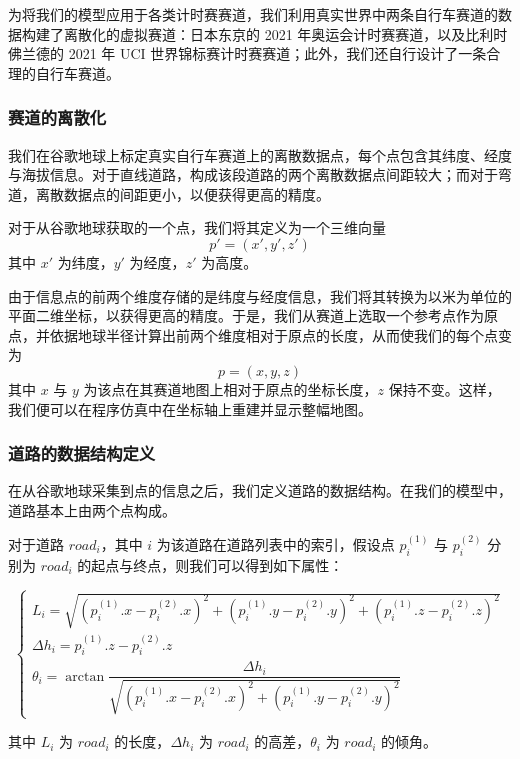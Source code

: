 \documentclass[11pt,a4paper]{ctexart}
\begin{document}
为将我们的模型应用于各类计时赛赛道，我们利用真实世界中两条自行车赛道的数据构建了离散化的虚拟赛道：日本东京的 2021 年奥运会计时赛赛道，以及比利时佛兰德的 2021 年 UCI 世界锦标赛计时赛赛道；此外，我们还自行设计了一条合理的自行车赛道。

\subsubsection{赛道的离散化}

我们在谷歌地球上标定真实自行车赛道上的离散数据点，每个点包含其纬度、经度与海拔信息。对于直线道路，构成该段道路的两个离散数据点间距较大；而对于弯道，离散数据点的间距更小，以便获得更高的精度。

对于从谷歌地球获取的一个点，我们将其定义为一个三维向量
\[
p'=(x',y',z')
\]
其中 $x'$ 为纬度，$y'$ 为经度，$z'$ 为高度。

由于信息点的前两个维度存储的是纬度与经度信息，我们将其转换为以米为单位的平面二维坐标，以获得更高的精度。于是，我们从赛道上选取一个参考点作为原点，并依据地球半径计算出前两个维度相对于原点的长度，从而使我们的每个点变为
\[
p=(x,y,z)
\]
其中 $x$ 与 $y$ 为该点在其赛道地图上相对于原点的坐标长度，$z$ 保持不变。这样，我们便可以在程序仿真中在坐标轴上重建并显示整幅地图。

\subsubsection{道路的数据结构定义}

在从谷歌地球采集到点的信息之后，我们定义道路的数据结构。在我们的模型中，道路基本上由两个点构成。

对于道路 $road_i$，其中 $i$ 为该道路在道路列表中的索引，假设点 $p_i^{(1)}$ 与 $p_i^{(2)}$ 分别为 $road_i$ 的起点与终点，则我们可以得到如下属性：

\begin{equation}
\begin{cases}
L_i=\sqrt{\left(p_i^{(1)}.x-p_i^{(2)}.x\right)^2+\left(p_i^{(1)}.y-p_i^{(2)}.y\right)^2+\left(p_i^{(1)}.z-p_i^{(2)}.z\right)^2}\\[0.6em]
\Delta h_i=p_i^{(1)}.z-p_i^{(2)}.z\\[0.4em]
\theta_i=\arctan\dfrac{\Delta h_i}{\sqrt{\left(p_i^{(1)}.x-p_i^{(2)}.x\right)^2+\left(p_i^{(1)}.y-p_i^{(2)}.y\right)^2}}
\end{cases}
\end{equation}

其中 $L_i$ 为 $road_i$ 的长度，$\Delta h_i$ 为 $road_i$ 的高差，$\theta_i$ 为 $road_i$ 的倾角。
\end{document}
